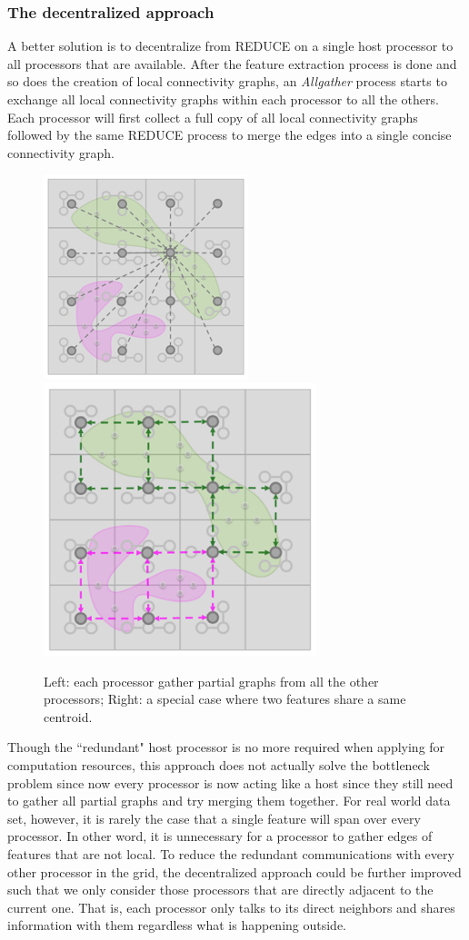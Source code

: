 \documentclass[10pt, conference, compsocconf]{IEEEtran}
\begin{document}
\subsubsection{The decentralized approach}
A better solution is to decentralize from REDUCE on a single host processor to all processors that are available. After the feature extraction process is done and so does the creation of local connectivity graphs, an \emph{Allgather} process starts to exchange all local connectivity graphs within each processor to all the others. Each processor will first collect a full copy of all local connectivity graphs followed by the same REDUCE process to merge the edges into a single concise connectivity graph.

\begin{figure}[ht]
\centering
\includegraphics[width=0.45\linewidth]{figure3.png}
\includegraphics[width=0.45\linewidth]{figure4.png}
\caption{Left: each processor gather partial graphs from all the other processors; Right: a special case where two features share a same centroid.}
\label{fig:decent}
\end{figure}


Though the ``redundant" host processor is no more required when applying for computation resources, this approach does not actually solve the bottleneck problem since now every processor is now acting like a host since they still need to gather all partial graphs and try merging them together. For real world data set, however, it is rarely the case that a single feature will span over every processor. In other word, it is unnecessary for a processor to gather edges of features that are not local. To reduce the redundant communications with every other processor in the grid, the decentralized approach could be further improved such that we only consider those processors that are directly adjacent to the current one. That is, each processor only talks to its direct neighbors and shares information with them regardless what is happening outside.
\end{document}
